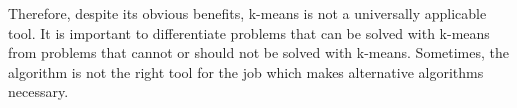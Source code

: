 Therefore, despite its obvious benefits, k-means is not a universally applicable tool.
It is important to differentiate problems that can be solved with k-means from problems that cannot or should not be solved with k-means.
Sometimes, the algorithm is not the right tool for the job which makes alternative algorithms necessary.





